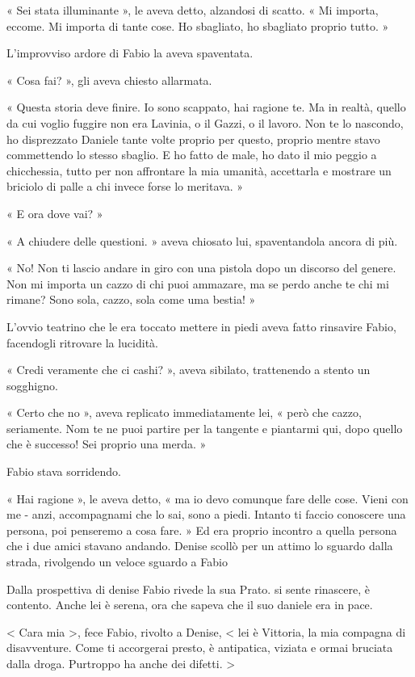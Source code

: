 « Sei stata illuminante », le aveva detto, alzandosi di scatto. « Mi importa, eccome. Mi importa di tante cose. Ho sbagliato, ho sbagliato proprio tutto. »

L'improvviso ardore di Fabio la aveva spaventata.

« Cosa fai? », gli aveva chiesto allarmata.

« Questa storia deve finire. Io sono scappato, hai ragione te. Ma in realtà, quello da cui voglio fuggire non era Lavinia, o il Gazzi, o il lavoro. Non te lo nascondo, ho disprezzato Daniele tante volte proprio per questo, proprio mentre stavo commettendo lo stesso sbaglio. E ho fatto de male, ho dato il mio peggio a chicchessia, tutto per non affrontare la mia umanità, accettarla e mostrare un briciolo di palle a chi invece forse lo meritava. »

« E ora dove vai? »

« A chiudere delle questioni. » aveva chiosato lui, spaventandola ancora di più.

« No! Non ti lascio andare in giro con una pistola dopo un discorso del genere. Non mi importa un cazzo di chi puoi ammazare, ma se perdo anche te chi mi rimane? Sono sola, cazzo, sola come uma bestia! »

L’ovvio teatrino che le era toccato mettere in piedi aveva fatto rinsavire Fabio, facendogli ritrovare la lucidità.

« Credi veramente che ci cashi? », aveva sibilato, trattenendo a stento un sogghigno.

« Certo che no », aveva replicato immediatamente lei, « però che cazzo, seriamente. Nom te ne puoi partire per la tangente e piantarmi qui, dopo quello che è successo! Sei proprio una merda. »

Fabio stava sorridendo. 

« Hai ragione », le aveva detto, « ma io devo comunque fare delle cose. Vieni con me - anzi, accompagnami che lo sai, sono a piedi. Intanto ti faccio conoscere una persona, poi penseremo a cosa fare. »
​
Ed era proprio incontro a quella persona che i due amici stavano andando. Denise scollò per un attimo lo sguardo dalla strada, rivolgendo un veloce sguardo a Fabio

Dalla prospettiva di denise
Fabio rivede la sua Prato. si sente rinascere, è contento. Anche lei è serena, ora che sapeva che il suo daniele era in pace.

< Cara mia >, fece Fabio, rivolto a Denise, < lei è Vittoria, la mia compagna di disavventure. Come ti accorgerai presto, è antipatica, viziata e ormai bruciata dalla droga. Purtroppo ha anche dei difetti. >

